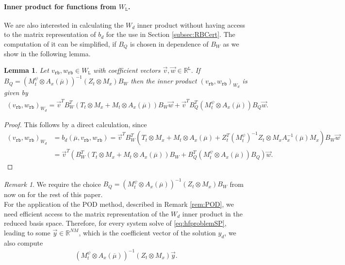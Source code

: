 \documentclass{article}
\theoremstyle{plain}
\newtheorem{lemma}[theorem]{Lemma}
\theoremstyle{definition}
\theoremstyle{remark}
\newtheorem{remark}[theorem]{Remark}
\newcommand{\RR}{\mathbb{R}}
\begin{document}
\paragraph*{Inner product for functions from $W_\texttt{L}$.} We are also interested in calculating the $W_d$ inner product without having access to the matrix representation of $b_d$ for the use in Section \ref{subsec:RBCert}. The computation of it can be simplified, if $B_Q$ is chosen in dependence of $B_W$ as we show in the following lemma.
\begin{lemma}\label{lem:choiceRB}
Let $v_\texttt{rb}, w_\texttt{rb} \in W_\texttt{L}$ with coefficient vectors $\Vec{v}, \Vec{w} \in \RR^\texttt{L}$. If $B_Q = (M_t^\psi \otimes A_x(\overline{\mu}))^{-1} (Z_t \otimes M_x) B_W$ then the inner product $(v_\texttt{rb}, w_\texttt{rb})_{W_d}$ is given by
\begin{align}
    (v_\texttt{rb}, w_\texttt{rb})_{W_d} = \Vec{v}^T B_W^T(T_t \otimes M_x + M_t \otimes A_x(\overline{\mu})) B_W \Vec{w} + \Vec{v}^T B_Q^T (M_t^\psi \otimes A_x(\overline{\mu})) B_Q \Vec{w} .
\end{align}
\end{lemma}
\begin{proof}
This follows by a direct calculation, since
\begin{align}
    (v_\texttt{rb}, w_\texttt{rb})_{W_d} &= b_d(\overline{\mu}, v_\texttt{rb}, w_\texttt{rb}) = \Vec{v}^T B_W^T (T_t \otimes M_x + M_t \otimes A_x(\overline{\mu}) + Z_t^T (M_t^\psi)^{-1} Z_t \otimes M_x A_x^{-1}(\overline{\mu}) M_x) B_W\Vec{w} \\
    &= \Vec{v}^T \left( B_W^T(T_t \otimes M_x + M_t \otimes A_x(\overline{\mu})) B_W + B_Q^T (M_t^\psi \otimes A_x(\overline{\mu})) B_Q \right) \Vec{w} .
\end{align}
\end{proof}
\begin{remark}\label{rem:choiceQK}
    We require the choice $B_Q = (M_t^\psi \otimes A_x(\overline{\mu}))^{-1} (Z_t \otimes M_x) B_W$ from now on for the rest of this paper. \\
    For the application of the POD method, described in Remark \ref{rem:POD}, we need efficient access to the matrix representation of the $W_d$ inner product in the reduced basis space. Therefore, for every system solve of \eqref{eq:hfproblemSP}, leading to some $\Vec{y} \in \RR^{NM}$, which is the coefficient vector of the solution $y_d$, we also compute 
\begin{align}
    (M_t^\psi \otimes A_x(\overline{\mu}))^{-1} (Z_t \otimes M_x) \Vec{y} .
\end{align}
\end{remark}
\end{document}
